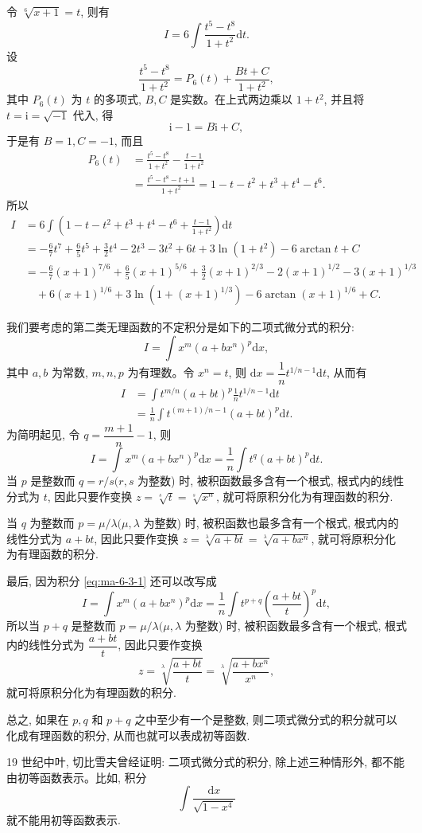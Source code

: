 \begin{solve}
令 $\sqrt[6]{x+1}=t$, 则有
\[
  I=6\int\frac{t^5-t^8}{1+t^2}\mathrm dt.
\]
设
\[
  \frac{t^5-t^8}{1+t^2}=P_6(t)+\frac{Bt+C}{1+t^2},
\]
其中 $P_6(t)$ 为 $t$ 的多项式, $B,C$ 是实数。在上式两边乘以 $1+t^2$, 并且将 $t=\mathrm i=\sqrt{-1}$ 代入, 得
\[
  \mathrm i-1=B\mathrm i+C,
\]
于是有 $B=1,C=-1$, 而且
\[
\begin{aligned}
  P_6(t)
  &=
  \frac{t^5-t^8}{1+t^2}-\frac{t-1}{1+t^2}\\
  &=
  \frac{t^5-t^8-t+1}{1+t^2}
  =
  1-t-t^2+t^3+t^4-t^6.
\end{aligned}
\]
所以
\[
\begin{aligned}
  I
  &=
  6\int\left(1-t-t^2+t^3+t^4-t^6+\frac{t-1}{1+t^2}\right)\mathrm dt\\
  &=
  -\frac67t^7+\frac65t^5+\frac32t^4-2t^3-3t^2+6t
  +3\ln(1+t^2)-6\arctan t+C\\
  &=
  -\frac67(x+1)^{7/6}+\frac65(x+1)^{5/6}
  +\frac32(x+1)^{2/3}-2(x+1)^{1/2}-3(x+1)^{1/3}\\
  &\quad+
  6(x+1)^{1/6}+3\ln\left(1+(x+1)^{1/3}\right)
  -6\arctan(x+1)^{1/6}+C.
\end{aligned}
\]

我们要考虑的第二类无理函数的不定积分是如下的二项式微分式的积分:
\[
  I=\int x^m(a+bx^n)^p\mathrm dx,
\]
其中 $a,b$ 为常数, $m,n,p$ 为有理数。令 $x^n=t$, 则 $\mathrm dx=\dfrac1n t^{1/n-1}\mathrm dt$, 从而有
\[
\begin{aligned}
  I
  &=
  \int t^{m/n}(a+bt)^p\frac1n t^{1/n-1}\mathrm dt\\
  &=
  \frac1n\int t^{(m+1)/n-1}(a+bt)^p\mathrm dt.
\end{aligned}
\]
为简明起见, 令 $q=\dfrac{m+1}n-1$, 则
\begin{equation}
  I=\int x^m(a+bx^n)^p\mathrm dx
  =
  \frac1n\int t^q(a+bt)^p\mathrm dt.
  \label{eq:ma-6-3-1}
\end{equation}
当 $p$ 是整数而 $q=r/s(r,s$ 为整数) 时, 被积函数最多含有一个根式, 根式内的线性分式为 $t$, 因此只要作变换 $z=\sqrt[s]{t}=\sqrt[s]{x^n}$, 就可将原积分化为有理函数的积分.

当 $q$ 为整数而 $p=\mu/\lambda(\mu,\lambda$ 为整数) 时, 被积函数也最多含有一个根式, 根式内的线性分式为 $a+bt$, 因此只要作变换 $z=\sqrt[\lambda]{a+bt}=\sqrt[\lambda]{a+bx^n}$, 就可将原积分化为有理函数的积分.

最后, 因为积分 \eqref{eq:ma-6-3-1} 还可以改写成
\[
  I=\int x^m(a+bx^n)^p\mathrm dx
  =
  \frac1n\int t^{p+q}\left(\frac{a+bt}{t}\right)^p\mathrm dt,
\]
所以当 $p+q$ 是整数而 $p=\mu/\lambda(\mu,\lambda$ 为整数) 时, 被积函数最多含有一个根式, 根式内的线性分式为 $\dfrac{a+bt}{t}$, 因此只要作变换
\[
  z=\sqrt[\lambda]{\frac{a+bt}{t}}
  =
  \sqrt[\lambda]{\frac{a+bx^n}{x^n}},
\]
就可将原积分化为有理函数的积分.

总之, 如果在 $p,q$ 和 $p+q$ 之中至少有一个是整数, 则二项式微分式的积分就可以化成有理函数的积分, 从而也就可以表成初等函数.

19 世纪中叶, 切比雪夫曾经证明: 二项式微分式的积分, 除上述三种情形外, 都不能由初等函数表示。比如, 积分
\[
  \int\frac{\mathrm dx}{\sqrt{1-x^4}}
\]
就不能用初等函数表示.
\end{solve}


